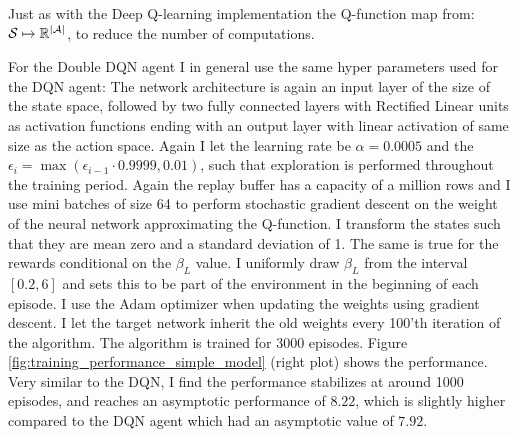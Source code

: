 Just as with the Deep Q-learning implementation the Q-function map from: $\mathcal{S} \mapsto \mathbb{R}^{\mid \mathcal{A} \mid}$, to reduce the number of computations. 

For the Double DQN agent I in general use the same hyper parameters used for the DQN agent: The network architecture is again an input layer of the size of the state space, followed by two fully connected layers with Rectified Linear units as activation functions ending with an output layer with linear activation of same size as the action space. Again I let the learning rate be $\alpha = 0.0005$ and the $\epsilon_i = \max (\epsilon_{i-1} \cdot 0.9999, 0.01)$, such that exploration is performed throughout the training period. Again the replay buffer has a capacity of a million rows and I use mini batches of size 64 to perform stochastic gradient descent on the weight of the neural network approximating the Q-function. I transform the states such that they are mean zero and a standard deviation of 1. The same is true for the rewards conditional on the $\beta_L$ value. I uniformly draw $\beta_L$ from the interval $[0.2, 6]$ and sets this to be part of the environment in the beginning of each episode. I use the Adam optimizer when updating the weights using gradient descent. I let the target network inherit the old weights every 100'th iteration of the algorithm. The algorithm is trained for 3000 episodes. Figure \ref{fig:training_performance_simple_model} (right plot) shows the performance. Very similar to the DQN, I find the performance stabilizes at around 1000 episodes, and reaches an asymptotic performance of $8.22$, which is slightly higher compared to the DQN agent which had an asymptotic value of $7.92$.

